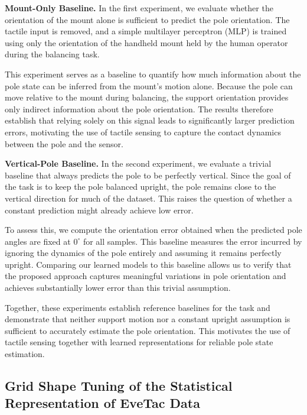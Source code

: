 \documentclass{article}
\begin{document}
\par \textbf{Mount-Only Baseline.}
In the first experiment, we evaluate whether the orientation of the mount alone is sufficient to predict the pole orientation. The tactile input is removed, and a simple multilayer perceptron (MLP) is trained using only the orientation of the handheld mount held by the human operator during the balancing task.

This experiment serves as a baseline to quantify how much information about the pole state can be inferred from the mount's motion alone. Because the pole can move relative to the mount during balancing, the support orientation provides only indirect information about the pole orientation. The results therefore establish that relying solely on this signal leads to significantly larger prediction errors, motivating the use of tactile sensing to capture the contact dynamics between the pole and the sensor.

\par \textbf{Vertical-Pole Baseline.}
In the second experiment, we evaluate a trivial baseline that always predicts the pole to be perfectly vertical. Since the goal of the task is to keep the pole balanced upright, the pole remains close to the vertical direction for much of the dataset. This raises the question of whether a constant prediction might already achieve low error.

To assess this, we compute the orientation error obtained when the predicted pole angles are fixed at $0^\circ$ for all samples. This baseline measures the error incurred by ignoring the dynamics of the pole entirely and assuming it remains perfectly upright. Comparing our learned models to this baseline allows us to verify that the proposed approach captures meaningful variations in pole orientation and achieves substantially lower error than this trivial assumption.

Together, these experiments establish reference baselines for the task and demonstrate that neither support motion nor a constant upright assumption is sufficient to accurately estimate the pole orientation. This motivates the use of tactile sensing together with learned representations for reliable pole state estimation.

\subsection{Grid Shape Tuning of the Statistical Representation of EveTac Data}
\end{document}
